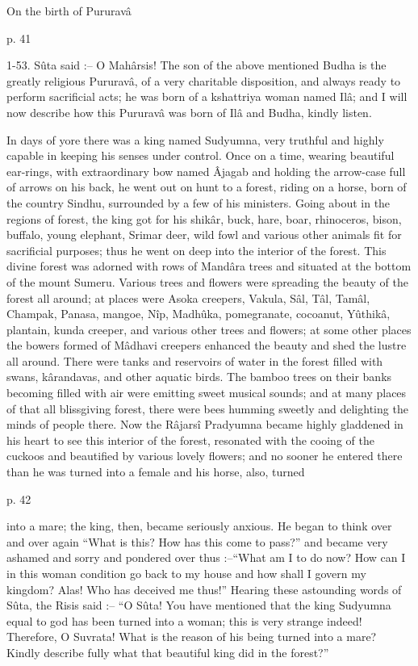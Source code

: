 On the birth of Pururavâ

 

p. 41

 

1-53. Sûta said :-- O Mahârsis! The son of the above mentioned Budha is the greatly religious Pururavâ, of a very charitable disposition, and always ready to perform sacrificial acts; he was born of a kshattriya woman named Ilâ; and I will now describe how this Pururavâ was born of Ilâ and Budha, kindly listen.

 

In days of yore there was a king named Sudyumna, very truthful and highly capable in keeping his senses under control. Once on a time, wearing beautiful ear-rings, with extraordinary bow named Âjagab and holding the arrow-case full of arrows on his back, he went out on hunt to a forest, riding on a horse, born of the country Sindhu, surrounded by a few of his ministers. Going about in the regions of forest, the king got for his shikâr, buck, hare, boar, rhinoceros, bison, buffalo, young elephant, Srimar deer, wild fowl and various other animals fit for sacrificial purposes; thus he went on deep into the interior of the forest. This divine forest was adorned with rows of Mandâra trees and situated at the bottom of the mount Sumeru. Various trees and flowers were spreading the beauty of the forest all around; at places were Asoka creepers, Vakula, Sâl, Tâl, Tamâl, Champak, Panasa, mangoe, Nîp, Madhûka, pomegranate, cocoanut, Yûthikâ, plantain, kunda creeper, and various other trees and flowers; at some other places the bowers formed of Mâdhavi creepers enhanced the beauty and shed the lustre all around. There were tanks and reservoirs of water in the forest filled with swans, kârandavas, and other aquatic birds. The bamboo trees on their banks becoming filled with air were emitting sweet musical sounds; and at many places of that all blissgiving forest, there were bees humming sweetly and delighting the minds of people there. Now the Râjarsî Pradyumna became highly gladdened in his heart to see this interior of the forest, resonated with the cooing of the cuckoos and beautified by various lovely flowers; and no sooner he entered there than he was turned into a female and his horse, also, turned

 

p. 42

 

into a mare; the king, then, became seriously anxious. He began to think over and over again “What is this? How has this come to pass?” and became very ashamed and sorry and pondered over thus :--“What am I to do now? How can I in this woman condition go back to my house and how shall I govern my kingdom? Alas! Who has deceived me thus!” Hearing these astounding words of Sûta, the Risis said :-- “O Sûta! You have mentioned that the king Sudyumna equal to god has been turned into a woman; this is very strange indeed! Therefore, O Suvrata! What is the reason of his being turned into a mare? Kindly describe fully what that beautiful king did in the forest?”

